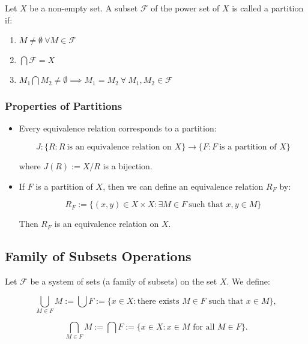 Let \(X\) be a non-empty set. A subset \(\mathscr{F}\) of the power set of \(X\) is called a 
partition if:

\begin{enumerate}
	
	\item \(M \neq  \emptyset\ \forall M \in \mathscr{F}\)
 
	\item \(\bigcap \mathscr{F} = X\)
 
	\item \(M_1 \bigcap M_2 \ne \emptyset \implies M_1 = M_2\ \forall\ M_1, M_2 \in \mathscr{F} \) 

\end{enumerate}

\subsubsection{Properties of Partitions}

\begin{itemize}

	\item Every equivalence relation corresponds to a partition:

		  \[
		      J: \{ R : R\ \text{is an equivalence relation on } X\} \to \{ F: F\ \text{is a partition of } X\}
	      \]

	      where \( J(R) := X / R \) is a bijection.

	\item If \(F\) is a partition of \(X\), then we can define an equivalence relation \( R_F \) by:
	      
		  \[
		      R_F := \{ (x, y) \in X \times X : \exists M \in F\ \text{such that } x, y \in M \}
	      \]
	      
		  Then \( R_F \) is an equivalence relation on \(X\).

\end{itemize}

\subsection{Family of Subsets Operations}

Let \(\mathscr{F}\) be a system of sets (a family of subsets) on the set \(X\). We define:

\[
	\bigcup_{M \in F} M := \bigcup F := \{ x \in X : \text{there exists } M \in F \text{ such that } x 
	\in M \} ,
\]

\[
	\bigcap_{M \in F} M := \bigcap F := \{ x \in X : x \in M \text{ for all } M \in F \} .
\]